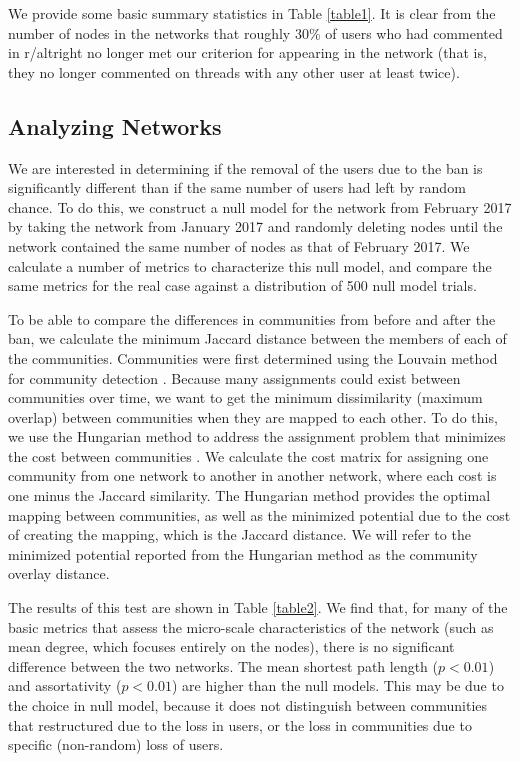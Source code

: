 \documentclass[twoside,twocolumn]{article}
\begin{document}

We provide some basic summary statistics in Table \ref{table1}. It is clear from the number of nodes in the networks that roughly 30\% of users who had commented in r/altright no longer met our criterion for appearing in the network (that is, they no longer commented on threads with any other user at least twice). 


\subsection{Analyzing Networks}

We are interested in determining if the removal of the users due to the ban is significantly different than if the same number of users had left by random chance. To do this, we construct a null model for the network from February 2017 by taking the network from January 2017 and randomly deleting nodes until the network contained the same number of nodes as that of February 2017. We calculate a number of metrics to characterize this null model, and compare the same metrics for the real case against a distribution of 500 null model trials. 

To be able to compare the differences in communities from before and after the ban, we calculate the minimum Jaccard distance between the members of each of the communities. Communities were first determined using the Louvain method for community detection \cite{louvain}. Because many assignments could exist between communities over time, we want to get the minimum dissimilarity (maximum overlap) between communities when they are mapped to each other. To do this, we use the Hungarian method to address the assignment problem that minimizes the cost between communities \cite{dedecko}. We calculate the cost matrix for assigning one community from one network to another in another network, where each cost is one minus the Jaccard similarity. The Hungarian method provides the optimal mapping between communities, as well as the minimized potential due to the cost of creating the mapping, which is the Jaccard distance. We will refer to the minimized potential reported from the Hungarian method as the community overlay distance. 

The results of this test are shown in Table \ref{table2}. We find that, for many of the basic metrics that assess the micro-scale characteristics of the network (such as mean degree, which focuses entirely on the nodes), there is no significant difference between the two networks. The mean shortest path length ($p<0.01$) and assortativity ($p<0.01$) are higher than the null models. This may be due to the choice in null model, because it does not distinguish between communities that restructured due to the loss in users, or the loss in communities due to specific (non-random) loss of users. 
\end{document}
